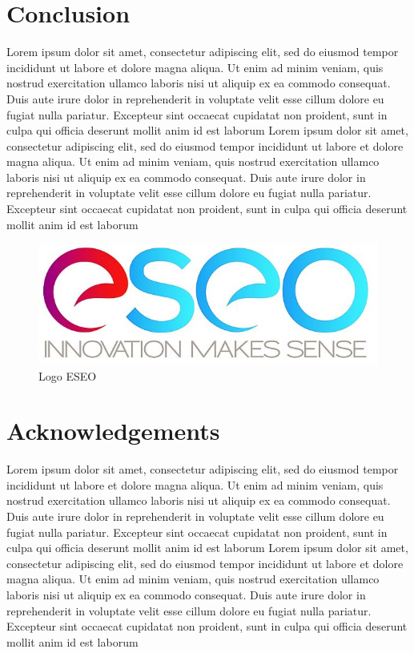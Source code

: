 \documentclass[twoside,twocolumn]{article}                          %
\begin{document}
\section{Conclusion}
Lorem ipsum dolor sit amet, consectetur adipiscing elit, sed do eiusmod tempor incididunt ut labore et dolore magna aliqua. Ut enim ad minim veniam, quis nostrud exercitation ullamco laboris nisi ut aliquip ex ea commodo consequat. Duis aute irure dolor in reprehenderit in voluptate velit esse cillum dolore eu fugiat nulla pariatur. Excepteur sint occaecat cupidatat non proident, sunt in culpa qui officia deserunt mollit anim id est laborum
Lorem ipsum dolor sit amet, consectetur adipiscing elit, sed do eiusmod tempor incididunt ut labore et dolore magna aliqua. Ut enim ad minim veniam, quis nostrud exercitation ullamco laboris nisi ut aliquip ex ea commodo consequat. Duis aute irure dolor in reprehenderit in voluptate velit esse cillum dolore eu fugiat nulla pariatur. Excepteur sint occaecat cupidatat non proident, sunt in culpa qui officia deserunt mollit anim id est laborum

\begin{figure}[!h]
  \begin{center}
    \includegraphics[scale=0.2]{eseo.JPG}
  \end{center}
  \caption{Logo ESEO}
\end{figure}


\section{Acknowledgements}
Lorem ipsum dolor sit amet, consectetur adipiscing elit, sed do eiusmod tempor incididunt ut labore et dolore magna aliqua. Ut enim ad minim veniam, quis nostrud exercitation ullamco laboris nisi ut aliquip ex ea commodo consequat. Duis aute irure dolor in reprehenderit in voluptate velit esse cillum dolore eu fugiat nulla pariatur. Excepteur sint occaecat cupidatat non proident, sunt in culpa qui officia deserunt mollit anim id est laborum
Lorem ipsum dolor sit amet, consectetur adipiscing elit, sed do eiusmod tempor incididunt ut labore et dolore magna aliqua. Ut enim ad minim veniam, quis nostrud exercitation ullamco laboris nisi ut aliquip ex ea commodo consequat. Duis aute irure dolor in reprehenderit in voluptate velit esse cillum dolore eu fugiat nulla pariatur. Excepteur sint occaecat cupidatat non proident, sunt in culpa qui officia deserunt mollit anim id est laborum
\end{document}
